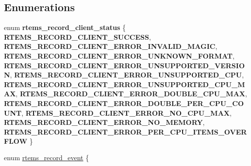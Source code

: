 \subsection*{Enumerations}
\begin{DoxyCompactItemize}
\item 
\mbox{\label{group__RTEMSRecord_ga9462a46b8c88e6d9fe58bfd0ee9776e5}} 
enum {\bfseries rtems\+\_\+record\+\_\+client\+\_\+status} \{ \newline
{\bfseries R\+T\+E\+M\+S\+\_\+\+R\+E\+C\+O\+R\+D\+\_\+\+C\+L\+I\+E\+N\+T\+\_\+\+S\+U\+C\+C\+E\+SS}, 
{\bfseries R\+T\+E\+M\+S\+\_\+\+R\+E\+C\+O\+R\+D\+\_\+\+C\+L\+I\+E\+N\+T\+\_\+\+E\+R\+R\+O\+R\+\_\+\+I\+N\+V\+A\+L\+I\+D\+\_\+\+M\+A\+G\+IC}, 
{\bfseries R\+T\+E\+M\+S\+\_\+\+R\+E\+C\+O\+R\+D\+\_\+\+C\+L\+I\+E\+N\+T\+\_\+\+E\+R\+R\+O\+R\+\_\+\+U\+N\+K\+N\+O\+W\+N\+\_\+\+F\+O\+R\+M\+AT}, 
{\bfseries R\+T\+E\+M\+S\+\_\+\+R\+E\+C\+O\+R\+D\+\_\+\+C\+L\+I\+E\+N\+T\+\_\+\+E\+R\+R\+O\+R\+\_\+\+U\+N\+S\+U\+P\+P\+O\+R\+T\+E\+D\+\_\+\+V\+E\+R\+S\+I\+ON}, 
\newline
{\bfseries R\+T\+E\+M\+S\+\_\+\+R\+E\+C\+O\+R\+D\+\_\+\+C\+L\+I\+E\+N\+T\+\_\+\+E\+R\+R\+O\+R\+\_\+\+U\+N\+S\+U\+P\+P\+O\+R\+T\+E\+D\+\_\+\+C\+PU}, 
{\bfseries R\+T\+E\+M\+S\+\_\+\+R\+E\+C\+O\+R\+D\+\_\+\+C\+L\+I\+E\+N\+T\+\_\+\+E\+R\+R\+O\+R\+\_\+\+U\+N\+S\+U\+P\+P\+O\+R\+T\+E\+D\+\_\+\+C\+P\+U\+\_\+\+M\+AX}, 
{\bfseries R\+T\+E\+M\+S\+\_\+\+R\+E\+C\+O\+R\+D\+\_\+\+C\+L\+I\+E\+N\+T\+\_\+\+E\+R\+R\+O\+R\+\_\+\+D\+O\+U\+B\+L\+E\+\_\+\+C\+P\+U\+\_\+\+M\+AX}, 
{\bfseries R\+T\+E\+M\+S\+\_\+\+R\+E\+C\+O\+R\+D\+\_\+\+C\+L\+I\+E\+N\+T\+\_\+\+E\+R\+R\+O\+R\+\_\+\+D\+O\+U\+B\+L\+E\+\_\+\+P\+E\+R\+\_\+\+C\+P\+U\+\_\+\+C\+O\+U\+NT}, 
\newline
{\bfseries R\+T\+E\+M\+S\+\_\+\+R\+E\+C\+O\+R\+D\+\_\+\+C\+L\+I\+E\+N\+T\+\_\+\+E\+R\+R\+O\+R\+\_\+\+N\+O\+\_\+\+C\+P\+U\+\_\+\+M\+AX}, 
{\bfseries R\+T\+E\+M\+S\+\_\+\+R\+E\+C\+O\+R\+D\+\_\+\+C\+L\+I\+E\+N\+T\+\_\+\+E\+R\+R\+O\+R\+\_\+\+N\+O\+\_\+\+M\+E\+M\+O\+RY}, 
{\bfseries R\+T\+E\+M\+S\+\_\+\+R\+E\+C\+O\+R\+D\+\_\+\+C\+L\+I\+E\+N\+T\+\_\+\+E\+R\+R\+O\+R\+\_\+\+P\+E\+R\+\_\+\+C\+P\+U\+\_\+\+I\+T\+E\+M\+S\+\_\+\+O\+V\+E\+R\+F\+L\+OW}
 \}
\item 
\mbox{\label{group__RTEMSRecord_gac748f47c13acd7d0595694ed7f19074b}} 
enum \mbox{\hyperlink{group__RTEMSRecord_gac748f47c13acd7d0595694ed7f19074b}{rtems\+\_\+record\+\_\+event}} \{ \newline

\end{DoxyCompactItemize}

